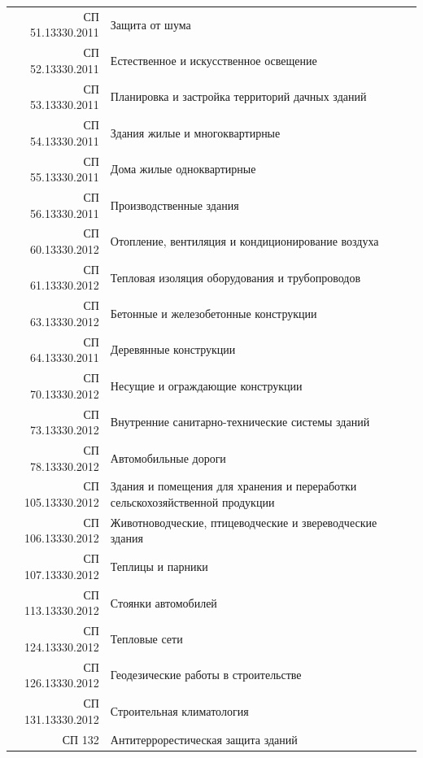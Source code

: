 \documentclass[10pt, twocolumn]{report}
\begin{document}
\begin{tabular}{rp{14cm}}
СП 51.13330.2011 & Защита от шума \\
СП 52.13330.2011 & Естественное и искусственное освещение \\
СП 53.13330.2011 & Планировка и застройка территорий дачных зданий \\
СП 54.13330.2011 & Здания жилые и многоквартирные \\
СП 55.13330.2011 & Дома жилые одноквартирные \\
СП 56.13330.2011 & Производственные здания \\
СП 60.13330.2012 & Отопление, вентиляция и кондиционирование воздуха \\
СП 61.13330.2012 & Тепловая изоляция оборудования и трубопроводов \\
СП 63.13330.2012 & Бетонные и железобетонные конструкции \\
СП 64.13330.2011 & Деревянные конструкции \\
СП 70.13330.2012 & Несущие и ограждающие конструкции \\
СП 73.13330.2012 & Внутренние санитарно-технические системы зданий \\
СП 78.13330.2012 & Автомобильные дороги \\
СП 105.13330.2012 & Здания и помещения для хранения и переработки сельскохозяйственной продукции \\
СП 106.13330.2012 & Животноводческие, птицеводческие и звереводческие здания \\
СП 107.13330.2012 & Теплицы и парники \\
СП 113.13330.2012 & Стоянки автомобилей \\
СП 124.13330.2012 & Тепловые сети \\
СП 126.13330.2012 & Геодезические работы в строительстве \\
СП 131.13330.2012 & Строительная климатология \\
СП 132 & Антитеррорестическая защита зданий \\
\end{tabular}

\newpage



\end{document}
